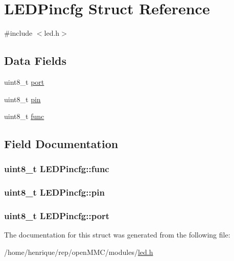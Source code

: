 \hypertarget{structLEDPincfg}{\section{L\-E\-D\-Pincfg Struct Reference}
\label{structLEDPincfg}
}


{\ttfamily \#include $<$led.\-h$>$}

\subsection*{Data Fields}
\begin{DoxyCompactItemize}
\item 
uint8\-\_\-t \hyperlink{structLEDPincfg_a923a47d797f59a024fb86e22e8166fbb}{port}
\item 
uint8\-\_\-t \hyperlink{structLEDPincfg_ad705253b477619d89cef8196ccb8fe3b}{pin}
\item 
uint8\-\_\-t \hyperlink{structLEDPincfg_af4fcbf32123522d823337721988d87a0}{func}
\end{DoxyCompactItemize}


\subsection{Field Documentation}
\hypertarget{structLEDPincfg_af4fcbf32123522d823337721988d87a0}{
\subsubsection[{func}]{\setlength{\rightskip}{0pt plus 5cm}uint8\-\_\-t L\-E\-D\-Pincfg\-::func}}\label{structLEDPincfg_af4fcbf32123522d823337721988d87a0}
\hypertarget{structLEDPincfg_ad705253b477619d89cef8196ccb8fe3b}{
\subsubsection[{pin}]{\setlength{\rightskip}{0pt plus 5cm}uint8\-\_\-t L\-E\-D\-Pincfg\-::pin}}\label{structLEDPincfg_ad705253b477619d89cef8196ccb8fe3b}
\hypertarget{structLEDPincfg_a923a47d797f59a024fb86e22e8166fbb}{
\subsubsection[{port}]{\setlength{\rightskip}{0pt plus 5cm}uint8\-\_\-t L\-E\-D\-Pincfg\-::port}}\label{structLEDPincfg_a923a47d797f59a024fb86e22e8166fbb}


The documentation for this struct was generated from the following file\-:\begin{DoxyCompactItemize}
\item 
/home/henrique/rep/open\-M\-M\-C/modules/\hyperlink{led_8h}{led.\-h}\end{DoxyCompactItemize}
